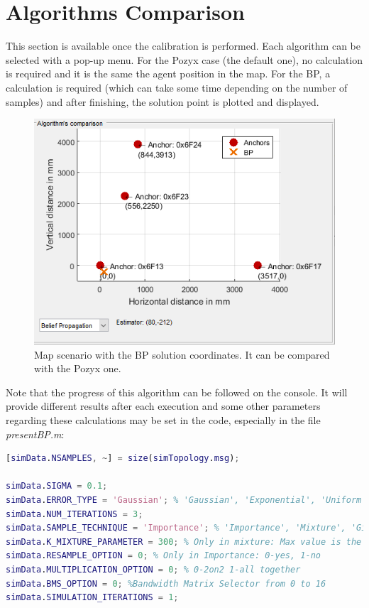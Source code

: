 \documentclass[a4paper, 21pt]{article} %
\begin{document}
\section{Algorithms Comparison}\label{se:ac}
This section is available once the calibration is performed. Each algorithm can be selected with a pop-up menu. For the Pozyx case (the default one), no calculation is required and it is the same the agent position in the map. For the BP, a calculation is required (which can take some time depending on the number of samples) and after finishing, the solution point is plotted and displayed.\\
\begin{figure}[H]
\begin{center}
\includegraphics[scale=.8]{fig/ss_ac.png}
\end{center}
\caption{Map scenario with the BP solution coordinates. It can be compared with the Pozyx one.}
\end{figure}

Note that the progress of this algorithm can be followed on the console. It will provide different results after each execution and some other parameters regarding these calculations may be set in the code, especially in the file \textit{presentBP.m}:
\begin{lstlisting}[language=matlab, breaklines=true, commentstyle=\color{blue}, basicstyle=\ttfamily\small]
% Sim Data 
[simData.NSAMPLES, ~] = size(simTopology.msg);

simData.SIGMA = 0.1;
simData.ERROR_TYPE = 'Gaussian'; % 'Gaussian', 'Exponential', 'Uniform'
simData.NUM_ITERATIONS = 3;
simData.SAMPLE_TECHNIQUE = 'Importance'; % 'Importance', 'Mixture', 'Gibbs'
simData.K_MIXTURE_PARAMETER = 300; % Only in mixture: Max value is the number of devices + 1 is connected a device
simData.RESAMPLE_OPTION = 0; % Only in Importance: 0-yes, 1-no
simData.MULTIPLICATION_OPTION = 0; % 0-2on2 1-all together
simData.BMS_OPTION = 0; %Bandwidth Matrix Selector from 0 to 16
simData.SIMULATION_ITERATIONS = 1;
  
\end{lstlisting}
\end{document}
